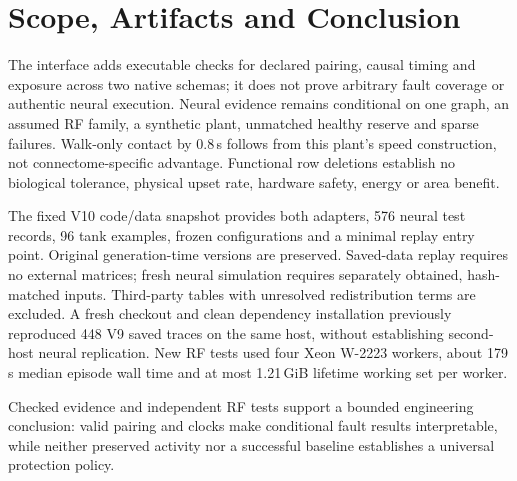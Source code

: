 \iffourfigures\newpage\fi
\section{Scope, Artifacts and Conclusion}
The interface adds executable checks for declared pairing, causal timing and exposure across two native schemas; it does not prove arbitrary fault coverage or authentic neural execution. Neural evidence remains conditional on one graph, an assumed RF family, a synthetic plant, unmatched healthy reserve and sparse failures. Walk-only contact by 0.8\,s follows from this plant's speed construction, not connectome-specific advantage. Functional row deletions establish no biological tolerance, physical upset rate, hardware safety, energy or area benefit.

The fixed V10 code/data snapshot\cite{artifactV10} provides both adapters, 576 neural test records, 96 tank examples, frozen configurations and a minimal replay entry point. Original generation-time versions are preserved. Saved-data replay requires no external matrices; fresh neural simulation requires separately obtained, hash-matched inputs. Third-party tables with unresolved redistribution terms are excluded. A fresh checkout and clean dependency installation previously reproduced 448 V9 saved traces on the same host, without establishing second-host neural replication. New RF tests used four Xeon W-2223 workers, about 179\,s median episode wall time and at most 1.21\,GiB lifetime working set per worker.

Checked evidence and independent RF tests support a bounded engineering conclusion: valid pairing and clocks make conditional fault results interpretable, while neither preserved activity nor a successful baseline establishes a universal protection policy.
